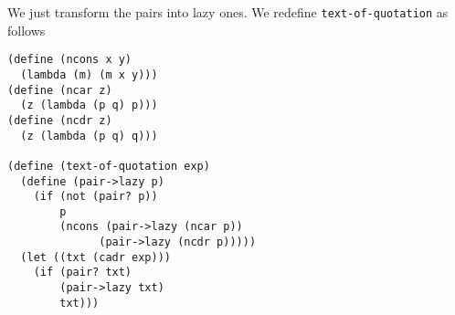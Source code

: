 \documentclass[a4paper,12pt]{article}
\begin{document}
We just transform the pairs into lazy ones.  We redefine
\lstinline!text-of-quotation! as follows
\begin{lstlisting}
(define (ncons x y)
  (lambda (m) (m x y)))
(define (ncar z)
  (z (lambda (p q) p)))
(define (ncdr z)
  (z (lambda (p q) q)))

(define (text-of-quotation exp)
  (define (pair->lazy p)
    (if (not (pair? p))
        p
        (ncons (pair->lazy (ncar p))
              (pair->lazy (ncdr p)))))
  (let ((txt (cadr exp)))
    (if (pair? txt)
        (pair->lazy txt)
        txt)))
\end{lstlisting}
\end{document}
